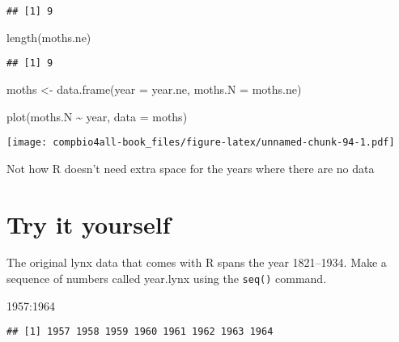 \documentclass[
]{book}
\newenvironment{Shaded}{\begin{snugshade}}{\end{snugshade}}
\newcommand{\AttributeTok}[1]{\textcolor[rgb]{0.77,0.63,0.00}{#1}}
\newcommand{\DecValTok}[1]{\textcolor[rgb]{0.00,0.00,0.81}{#1}}
\newcommand{\FunctionTok}[1]{\textcolor[rgb]{0.00,0.00,0.00}{#1}}
\newcommand{\NormalTok}[1]{#1}
\newcommand{\OtherTok}[1]{\textcolor[rgb]{0.56,0.35,0.01}{#1}}
\newcommand{\SpecialCharTok}[1]{\textcolor[rgb]{0.00,0.00,0.00}{#1}}
\begin{document}
\begin{verbatim}
## [1] 9
\end{verbatim}

\begin{Shaded}
\begin{Highlighting}[]
\FunctionTok{length}\NormalTok{(moths.ne)}
\end{Highlighting}
\end{Shaded}

\begin{verbatim}
## [1] 9
\end{verbatim}

\begin{Shaded}
\begin{Highlighting}[]
\NormalTok{moths }\OtherTok{\textless{}{-}} \FunctionTok{data.frame}\NormalTok{(}\AttributeTok{year =}\NormalTok{ year.ne,}
                    \AttributeTok{moths.N =}\NormalTok{ moths.ne)}
\end{Highlighting}
\end{Shaded}

\begin{Shaded}
\begin{Highlighting}[]
\FunctionTok{plot}\NormalTok{(moths.N }\SpecialCharTok{\textasciitilde{}}\NormalTok{ year, }\AttributeTok{data =}\NormalTok{ moths)}
\end{Highlighting}
\end{Shaded}

\texttt{[image: compbio4all-book\_files/figure-latex/unnamed-chunk-94-1.pdf]}

Not how R doesn't need extra space for the years where there are no data

\hypertarget{try-it-yourself}{%
\section{Try it yourself}\label{try-it-yourself}}

The original lynx data that comes with R spans the year 1821--1934. Make a sequence of numbers called year.lynx using the \texttt{seq()} command.

\begin{Shaded}
\begin{Highlighting}[]
\DecValTok{1957}\SpecialCharTok{:}\DecValTok{1964}
\end{Highlighting}
\end{Shaded}

\begin{verbatim}
## [1] 1957 1958 1959 1960 1961 1962 1963 1964
\end{verbatim}
\end{document}
